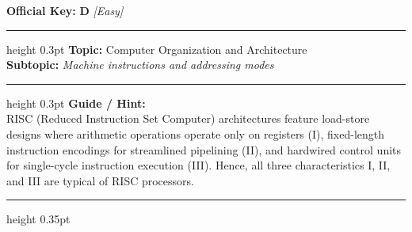 \documentclass[a4paper,10pt]{article}
\begin{document}
\begin{tcolorbox}
\textbf{Official Key:} \textbf{\large D} \hfill \textit{\small [Easy]}
\vspace{2pt}\hrule height 0.3pt\vspace{3pt}
\textbf{Topic:} Computer Organization and Architecture \\
\textbf{Subtopic:} \textit{Machine instructions and addressing modes}
\vspace{2pt}\hrule height 0.3pt\vspace{3pt}
\textbf{Guide / Hint:} \\
{\small RISC (Reduced Instruction Set Computer) architectures feature load-store designs where arithmetic operations operate only on registers (I), fixed-length instruction encodings for streamlined pipelining (II), and hardwired control units for single-cycle instruction execution (III). Hence, all three characteristics I, II, and III are typical of RISC processors.}

\end{tcolorbox}
\vspace{6pt}\hrule height 0.35pt\vspace{6pt}
\noindent
\end{document}
